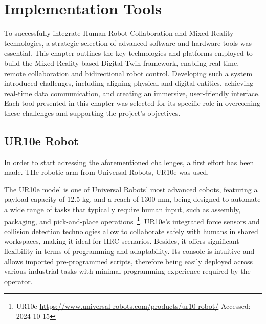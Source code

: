 

\chapter{Implementation Tools}%
\label{chapter:tools}



\begin{introduction}
    To successfully integrate Human-Robot Collaboration and Mixed Reality technologies, a strategic selection of advanced software and hardware tools was essential. This chapter outlines the key technologies and platforms employed to build the Mixed Reality-based Digital Twin framework, enabling real-time, remote collaboration and bidirectional robot control. Developing such a system introduced challenges, including aligning physical and digital entities, achieving real-time data communication, and creating an immersive, user-friendly interface. Each tool presented in this chapter was selected for its specific role in overcoming these challenges and supporting the project’s objectives.
\end{introduction}

\section{UR10e Robot}

In order to start adressing the aforementioned challenges, a first effort has been made. THe robotic arm from Universal Robots, UR10e was used.

The UR10e model is one of Universal Robots' most advanced cobots, featuring a payload capacity of 12.5 kg, and a reach of 1300 mm, being designed to automate a wide range of tasks that typically require human input, such as assembly, packaging, and pick-and-place operations~\footnote{UR10e \url{https://www.universal-robots.com/products/ur10-robot/} Accessed: 2024-10-15}. UR10e's integrated force sensors and collision detection technologies allow to collaborate safely with humans in shared workspaces, making it ideal for \ac{HRC} scenarios. Besides, it offers significant flexibility in terms of programming and adaptability. Its console is intuitive and allows imported pre-programmed scripts, therefore being easily deployed across various industrial tasks with minimal programming experience required by the operator.

